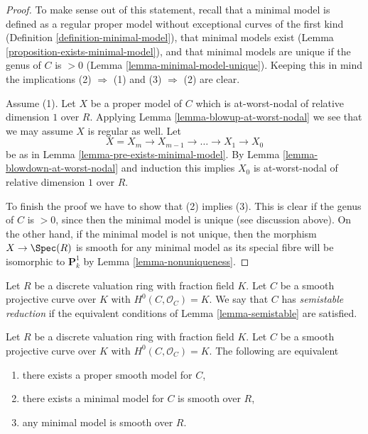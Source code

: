 \begin{proof}
To make sense out of this statement, recall that a
minimal model is defined as a regular proper model
without exceptional curves of the first kind
(Definition \ref{definition-minimal-model}),
that minimal models exist (Lemma \ref{proposition-exists-minimal-model}), and
that minimal models are unique if the genus
of $C$ is $> 0$ (Lemma \ref{lemma-minimal-model-unique}).
Keeping this in mind the implications (2) $\Rightarrow$ (1)
and (3) $\Rightarrow$ (2) are clear.

\medskip\noindent
Assume (1). Let $X$ be a proper model of $C$ which is
at-worst-nodal of relative dimension $1$ over $R$.
Applying Lemma \ref{lemma-blowup-at-worst-nodal}
we see that we may assume $X$ is regular as well.
Let
$$
X = X_m \to X_{m - 1} \to \ldots \to X_1 \to X_0
$$
be as in Lemma \ref{lemma-pre-exists-minimal-model}.
By Lemma \ref{lemma-blowdown-at-worst-nodal} and induction
this implies $X_0$ is at-worst-nodal of relative dimension $1$ over $R$.

\medskip\noindent
To finish the proof we have to show that (2) implies (3).
This is clear if the genus of $C$ is $> 0$, since then
the minimal model is unique (see discussion above).
On the other hand, if the minimal model is not unique, then
the morphism $X \to \Spec(R)$ is smooth for any minimal model
as its special fibre will be isomorphic to $\mathbf{P}^1_k$
by Lemma \ref{lemma-nonuniqueness}.
\end{proof}

\begin{definition}
\label{definition-semistable}
Let $R$ be a discrete valuation ring with fraction field $K$.
Let $C$ be a smooth projective curve over $K$ with $H^0(C, \mathcal{O}_C) = K$.
We say that $C$ has {\it semistable reduction} if the equivalent
conditions of Lemma \ref{lemma-semistable} are satisfied.
\end{definition}

\begin{lemma}
\label{lemma-good}
Let $R$ be a discrete valuation ring with fraction field $K$.
Let $C$ be a smooth projective curve over $K$ with $H^0(C, \mathcal{O}_C) = K$.
The following are equivalent
\begin{enumerate}
\item there exists a proper smooth model for $C$,
\item there exists a minimal model for $C$ is smooth over $R$,
\item any minimal model is smooth over $R$.
\end{enumerate}
\end{lemma}

